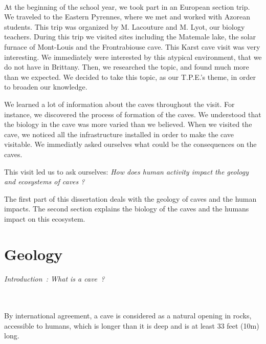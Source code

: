 \documentclass[draft, final]{report}
\begin{document}
~\newline
\newline
\newline
\newline
\newline
\newline
\newline

At the beginning of the school year, we took part in an European section trip. We traveled to the Eastern Pyrennes, where we met and worked with Azorean students. This trip was organized by M. Lacouture and M. Lyot, our biology teachers. During this trip we visited sites including the Matemale lake, the solar furnace of Mont-Louis and the Frontrabiouse cave. This Karst cave visit was very interesting. We immediately were interested by this atypical environment, that we do not have in Brittany. Then, we researched the topic, and found much more than we expected. We decided to take this topic, as our T.P.E.’s theme, in order to broaden our knowledge.\\
\par
We learned a lot of information about the caves throughout the visit. For instance, we discovered the process of formation of the caves. We understood that the biology in the cave was more varied than we believed. When we visited the cave, we noticed all the infrastructure installed in order to make the cave visitable. We immediatly asked ourselves what could be the consequences on the caves.\\
\par
This visit led us to ask ourselves: \emph{How does human activity impact the geology and ecosystems of caves ?}\\
\par
The first part of this dissertation deals with the geology of caves and the human impacts. The second section explains the biology of the caves and the humans impact on this ecosystem.
\newpage
\tableofcontents
\newpage

\part{Geology}

\paragraph{Introduction : What is a cave ?}
~\\
By international agreement, a cave is considered as a natural opening in rocks, accessible to humans, which is longer than it is deep and is at least 33 feet (10m) long.\\
\end{document}
